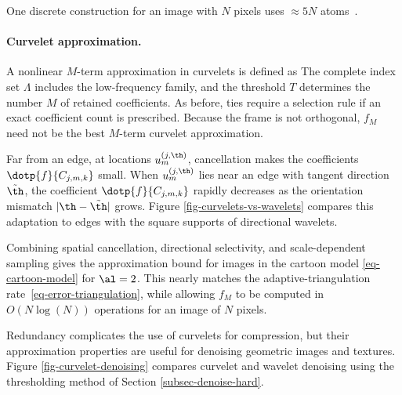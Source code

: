 One discrete construction for an image with $N$ pixels uses $\approx 5 N$ atoms~\cite{candes-discrete-curvelet}.

\paragraph{Curvelet approximation.}

A nonlinear $M$-term approximation in curvelets is defined as
The complete index set $\Lambda$ includes the low-frequency family, and the threshold $T$ determines the number $M$ of retained coefficients. As before, ties require a selection rule if an exact coefficient count is prescribed. Because the frame is not orthogonal, $f_M$ need not be the best $M$-term curvelet approximation.

Far from an edge, at locations $u_m^{(j,\th)}$, cancellation makes the coefficients $\dotp{f}{C_{j,m,k}}$ small. When $u_m^{(j,\th)}$ lies near an edge with tangent direction $\tilde\th$, the coefficient $\dotp{f}{C_{j,m,k}}$ rapidly decreases as the orientation mismatch $|\th-\tilde \th|$ grows. Figure \ref{fig-curvelets-vs-wavelets} compares this adaptation to edges with the square supports of directional wavelets.



Combining spatial cancellation, directional selectivity, and scale-dependent sampling gives the approximation bound
for images in the cartoon model \eqref{eq-cartoon-model} for $\al=2$.
This nearly matches the adaptive-triangulation rate~\eqref{eq-error-triangulation}, while allowing $f_M$ to be computed in $O(N \log(N))$ operations for an image of $N$ pixels.

Redundancy complicates the use of curvelets for compression, but their approximation properties are useful for denoising geometric images and textures. Figure \ref{fig-curvelet-denoising} compares curvelet and wavelet denoising using the thresholding method of Section \ref{subsec-denoise-hard}.








